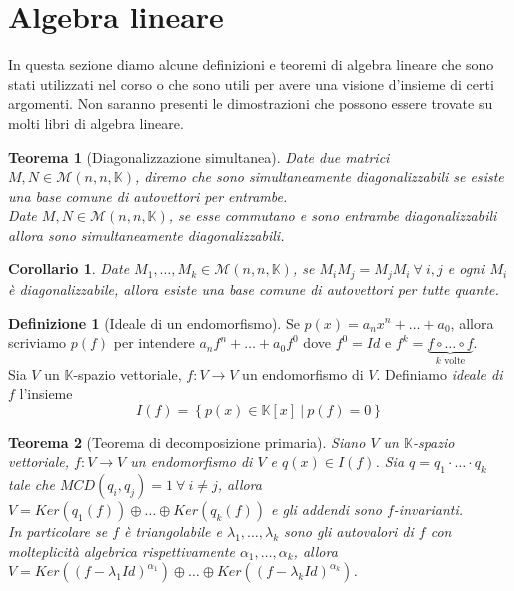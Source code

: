 \documentclass[11pt]{article}
\theoremstyle{plain}
\newtheorem{thm}{Teorema}[section]
\newtheorem*{cor}{Corollario}
\theoremstyle{definition}
\newtheorem{defn}{Definizione}[section]
\theoremstyle{remark}
\newcommand{\K}{\mathbb{K}}
\begin{document}
\newpage
\section{Algebra lineare}
In questa sezione diamo alcune definizioni e teoremi di algebra lineare che sono stati utilizzati nel corso o che sono utili per avere una visione d'insieme di certi argomenti. Non saranno presenti le dimostrazioni che possono essere trovate su molti libri di algebra lineare.
\begin{thm}[Diagonalizzazione simultanea]
\label{thm:diag_sim}
	Date due matrici $M, N\in \mathcal{M}(n,n,\K)$, diremo che sono \textit{simultaneamente diagonalizzabili} se esiste una base comune di autovettori per entrambe.\\
	Date $M, N\in \mathcal{M}(n,n,\K)$, se esse commutano e sono entrambe diagonalizzabili allora sono simultaneamente diagonalizzabili.
\end{thm}
\begin{cor}
	Date $M_1,\ldots,M_k \in \mathcal{M}(n,n,\K)$, se $M_iM_j=M_jM_i\ \forall\ i, j$ e ogni $M_i$ è diagonalizzabile, allora esiste una base comune di autovettori per tutte quante.
\end{cor}


\begin{defn}[Ideale di un endomorfismo]
	Se $p(x)=a_n x^n+\ldots+a_0$, allora scriviamo $p(f)$ per intendere $a_nf^n+\ldots+a_0f^0$ dove $f^0=Id$ e $f^k=\underbrace{f\circ\ldots\circ f}_{k \text{ volte}}$.\\
	Sia $V$ un $\K$-spazio vettoriale, $f:V\to V$ un endomorfismo di $V$. Definiamo \textit{ideale di $f$} l'insieme
	\[
		I(f)=\left\{ p(x)\in \K[x]\ |\ p(f)=0 \right\}
	\]
	

\end{defn}


\begin{thm}[Teorema di decomposizione primaria]
\label{thm:dec_primaria}
	Siano $V$ un $\K$-spazio vettoriale, $f:V\to V$ un endomorfismo di $V$ e $q(x)\in I(f)$. Sia $q=q_1\cdot\ldots\cdot q_k$ tale che $MCD(q_i,q_j)=1\ \forall\ i\neq j$, allora $V=Ker(q_1(f))\oplus\dots\oplus Ker(q_k(f))$ e gli addendi sono $f$-invarianti.\\
	In particolare se $f$ è triangolabile e $\lambda_1,\ldots,\lambda_k$ sono gli autovalori di $f$ con molteplicità algebrica rispettivamente $\alpha_1,\ldots,\alpha_k$, allora $V=Ker\left((f-\lambda_1 Id)^{\alpha_1}\right)\oplus\dots\oplus Ker\left((f-\lambda_k Id)^{\alpha_k}\right)$.
\end{thm}
\end{document}
